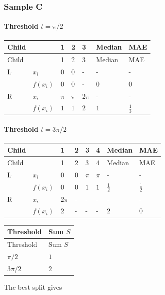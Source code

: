 \documentclass[10pt]{article}
\begin{document}
\subsubsection*{Sample C}
\paragraph*{Threshold $t=\pi/2$}
\begingroup
\small
\setlength{\tabcolsep}{4pt}
\begin{longtable}{l|l|l|l|l|l|l}
Child &  & 1 & 2 & 3 & Median & MAE \\
\hline
\endfirsthead
Child &  & 1 & 2 & 3 & Median & MAE \\
\hline
\endhead
L & $x_i$ & $0$ & $0$ & - & - & - \\[3pt]
 & $f(x_i)$ & $0$ & $0$ & - & $0$ & $0$ \\[3pt]
R & $x_i$ & $\pi$ & $\pi$ & $2\pi$ & - & - \\[3pt]
 & $f(x_i)$ & $1$ & $1$ & $2$ & $1$ & $\frac{1}{3}$ \\[3pt]
\end{longtable}
\endgroup
\paragraph*{Threshold $t=3\pi/2$}
\begingroup
\small
\setlength{\tabcolsep}{4pt}
\begin{longtable}{l|l|l|l|l|l|l|l}
Child &  & 1 & 2 & 3 & 4 & Median & MAE \\
\hline
\endfirsthead
Child &  & 1 & 2 & 3 & 4 & Median & MAE \\
\hline
\endhead
L & $x_i$ & $0$ & $0$ & $\pi$ & $\pi$ & - & - \\[3pt]
 & $f(x_i)$ & $0$ & $0$ & $1$ & $1$ & $\frac{1}{2}$ & $\frac{1}{2}$ \\[3pt]
R & $x_i$ & $2\pi$ & - & - & - & - & - \\[3pt]
 & $f(x_i)$ & $2$ & - & - & - & $2$ & $0$ \\[3pt]
\end{longtable}
\endgroup
\begingroup
\small
\setlength{\tabcolsep}{4pt}
\begin{longtable}{l|l}
Threshold & Sum $S$ \\
\hline
\endfirsthead
Threshold & Sum $S$ \\
\hline
\endhead
$\pi/2$ & $1$ \\[1.5pt]
$3\pi/2$ & $2$ \\[1.5pt]
\end{longtable}
\endgroup
The best split gives
\end{document}
